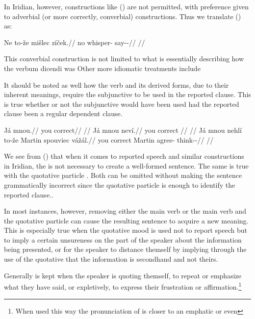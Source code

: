 In Iridian, however, constructions like () are not permitted, with preference given to adverbial (or more correctly, converbial) constructions. Thus we translate () as:

\pex
\begingl
\gla Ne to-že mišlec zíček.//
\glb no  whisper-\Cv{} say-\Av{}-\Pf{}//
\glft {}//
\endgl
\xe


This converbial construction is not limited to what is essentially describing how the verbum dicendi was  Other more idiomatic treatments include


It should be noted as well how the verb  and its derived forms, due to their inherent meanings, require the subjunctive to be used in the reported clause. This is true whether or not the subjunctive would have been used had the reported clause been a regular dependent clause.


\pex
\a
\begingl
  \gla Já mnou.//
  \glb you correct//
  \glft {}//
\endgl
\a
\begingl
  \gla Já mnou neví.//
  \glb you correct //
  \glft {}//
\endgl
\a
\begingl
  \gla Já mnou nehlí to-že Martin spouviec vážál.//
  \glb you correct   Martin agree-\Cv{} think-\Av{}-\Cont{}//
  \glft {}//
\endgl
\xe



We see from () that when it comes to reported speech and similar constructions in Iridian, the  is not necessary to create a well-formed sentence. The same is true with the quotative particle . Both can be omitted without making the sentence grammatically incorrect since the quotative particle is enough to identify the reported clause..

In most instances, however, removing either the main verb or the main verb and the quotative particle can cause the resulting sentence to acquire a new meaning. This is especially true when the quotative mood is used not to report speech but to imply a certain unsureness on the part of the speaker about the information being presented, or for the speaker to distance themself by implying through the use of the quotative that the information is secondhand and not theirs.

Generally  is kept when the speaker is quoting themself, to repeat or emphasize what they have said, or expletively, to express their frustration or affirmation.\footnote{When used this way the pronunciation of  is closer to an emphatic  or even }

